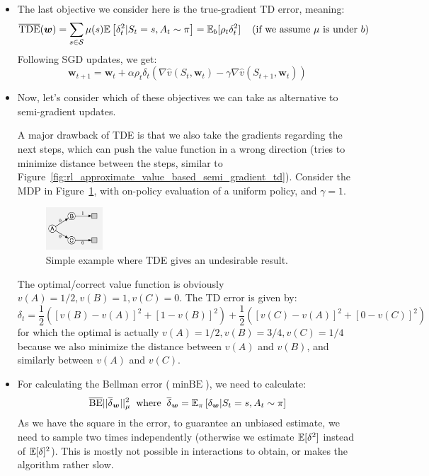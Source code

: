 \begin{itemize}
	\item The last objective we consider here is the true-gradient TD error, meaning: $$\overline{\text{TDE}}(\bm{w})=\sum_{s\in\mathcal{S}}\mu(s)\mathbb{E}\left[\delta_t^2 |S_t=s,A_t\sim \pi\right] = \mathbb{E}_{b}[\rho_t \delta_t^2] \hspace{4mm}\text{(if we assume $\mu$ is under $b$)}$$
	Following SGD updates, we get:
	$$\bm{w}_{t+1}=\bm{w}_t + \alpha \rho_t \delta_t (\nabla \hat{v}(S_t,\bm{w}_t) - \gamma \nabla \hat{v}(S_{t+1},\bm{w}_t))$$
	
	\item Now, let's consider which of these objectives we can take as alternative to semi-gradient updates. 
	
	A major drawback of TDE is that we also take the gradients regarding the next steps, which can push the value function in a wrong direction (tries to minimize distance between the steps, similar to Figure~\ref{fig:rl_approximate_value_based_semi_gradient_td}). Consider the MDP in Figure~\ref{fig:rl_approximation_value_based_TDE}, with on-policy evaluation of a uniform policy, and $\gamma=1$.
	
	\begin{figure}[ht!]
		\centering
		\includegraphics[width=0.2\textwidth]{figures/rl_approximation_value_based_TDE.png}
		\caption{Simple example where TDE gives an undesirable result.}
		\label{fig:rl_approximation_value_based_TDE}
	\end{figure}

	The optimal/correct value function is obviously $v(A)=1/2, v(B)=1, v(C)=0$. The TD error is given by:
	$$\delta_t=\frac{1}{2}\left(\left[v(B)-v(A)\right]^2 + \left[1-v(B)\right]^2\right)+\frac{1}{2}\left(\left[v(C)-v(A)\right]^2 + \left[0-v(C)\right]^2\right)$$
	for which the optimal is actually $v(A)=1/2, v(B)=3/4, v(C)=1/4$ because we also minimize the distance between $v(A)$ and $v(B)$, and similarly between $v(A)$ and $v(C)$.
	
	\item For calculating the Bellman error ($\min \text{BE}$), we need to calculate:
	$$\overline{\text{BE}}||\overline{\delta}_{\bm{w}}||_{\mu}^2\hspace{2mm}\text{where}\hspace{2mm}\overline{\delta}_{\bm{w}}=\mathbb{E}_{\pi}\left[\delta_{\bm{w}}|S_t=s,A_t\sim\pi\right]$$
	As we have the square in the error, to guarantee an unbiased estimate, we need to sample two times independently (otherwise we estimate $\mathbb{E}[\delta^2]$ instead of $\mathbb{E}[\delta]^2$). This is mostly not possible in interactions to obtain, or makes the algorithm rather slow.
	

\end{itemize}
